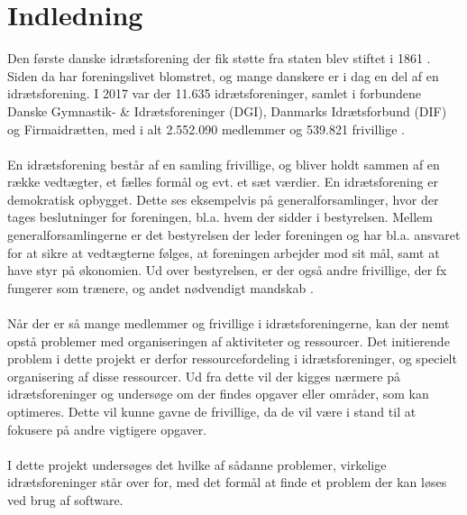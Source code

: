 \chapter{Indledning}\label{ch:introduction}
Den første danske idrætsforening der fik støtte fra staten blev stiftet i 1861 \cite{difhistorie}.\\
Siden da har foreningslivet blomstret, og mange danskere er i dag en del af en idrætsforening. I 2017 var der 11.635 idrætsforeninger, samlet i forbundene Danske Gymnastik- \& Idrætsforeninger (DGI), Danmarks Idrætsforbund (DIF) og Firmaidrætten, med i alt 2.552.090 medlemmer og 539.821 frivillige \cite{fester2018}.
\\\\
En idrætsforening består af en samling frivillige, og bliver holdt sammen af en række vedtægter, et fælles formål og evt. et sæt værdier. En idrætsforening er demokratisk opbygget. Dette ses eksempelvis på generalforsamlinger, hvor der tages beslutninger for foreningen, bl.a. hvem der sidder i bestyrelsen. Mellem generalforsamlingerne er det bestyrelsen der leder foreningen og har bl.a. ansvaret for at sikre at vedtægterne følges, at foreningen arbejder mod sit mål, samt at have styr på økonomien. Ud over bestyrelsen, er der også andre frivillige, der fx fungerer som trænere, og andet nødvendigt mandskab \citep{DGI} \citep{bestyrelsen}.
\\\\
Når der er så mange medlemmer og frivillige i idrætsforeningerne, kan der nemt opstå problemer med organiseringen af aktiviteter og ressourcer. Det initierende problem i dette projekt er derfor ressourcefordeling i idrætsforeninger, og specielt organisering af disse ressourcer.
Ud fra dette vil der kigges nærmere på idrætsforeninger og undersøge om der findes opgaver eller områder, som kan optimeres. Dette vil kunne gavne de frivillige, da de vil være i stand til at fokusere på andre vigtigere opgaver. 
\\\\
I dette projekt undersøges det hvilke af sådanne problemer, virkelige idrætsforeninger står over for, med det formål at finde et problem der kan løses ved brug af software.




